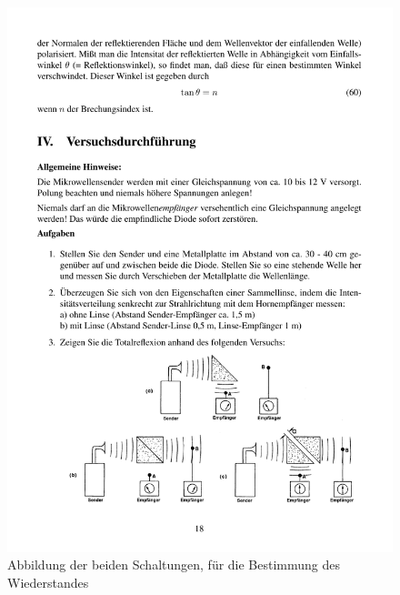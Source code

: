 \documentclass[12pt]{scrartcl}
\begin{document}
\begin{enumerate}
\begin{figure}[htbp] 
  \centering
    \includegraphics[trim = 80mm 15mm 0mm 160mm, clip, scale = 1]{totalreflexion.pdf}
  	\caption[Abbildung der beiden Schaltungen, für die Bestimmung des Wiederstandes]{Abbildung der beiden Schaltungen, für die Bestimmung des Wiederstandes\footnotemark}
  \label{fig:abb_versuch_3}
\end{figure}


\end{enumerate}
\end{document}
